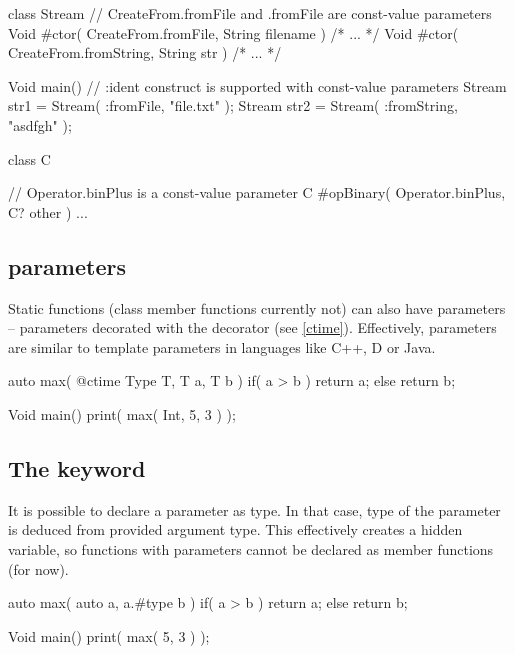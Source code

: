 \begin{code}
class Stream {
	// CreateFrom.fromFile and .fromFile are const-value parameters
	Void #ctor( CreateFrom.fromFile, String filename ) { /* ... */ }
	Void #ctor( CreateFrom.fromString, String str ) { /* ... */ } 
}

Void main() {
	// :ident construct is supported with const-value parameters
	Stream str1 = Stream( :fromFile, "file.txt" );
	Stream str2 = Stream( :fromString, "asdfgh" );
}
\end{code}

\begin{code}
class C {
	
	// Operator.binPlus is a const-value parameter
	C #opBinary( Operator.binPlus, C? other ) {
		...	
	}
	
}
\end{code}

\subsection{\ctime parameters} \label{function:ctimeParams}
Static functions (class member functions currently not) can also have \ctime parameters -- parameters decorated with the \ctime decorator (see \autoref{ctime}). Effectively, \ctime parameters are similar to template parameters in languages like C++, D or Java.

\begin{code}
auto max( @ctime Type T, T a, T b ) {
	if( a > b )
		return a;
	else
		return b;
}
	
Void main() {
	print( max( Int, 5, 3 ) );
}
\end{code}

\subsection{The  keyword}
It is possible to declare a parameter as  type. In that case, type of the parameter is deduced from provided argument type. This effectively creates a hidden  variable, so functions with  parameters cannot be declared as member functions (for now).

\begin{code}
auto max( auto a, a.#type b ) {
	if( a > b )
		return a;
	else
		return b;
}

Void main() {
	print( max( 5, 3 ) );
}
\end{code}

